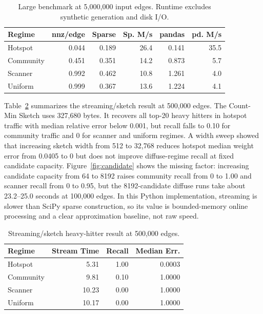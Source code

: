 \documentclass[conference]{IEEEtran}
\begin{document}
\begin{table}[t]
\centering
\caption{Large benchmark at 5,000,000 input edges. Runtime excludes synthetic generation and disk I/O.}
\label{tab:large}
\begin{tabular}{lrrrrr}
\toprule
Regime & nnz/edge & Sparse & Sp. M/s & pandas & pd. M/s \\
\midrule
Hotspot & 0.044 & 0.189 & 26.4 & 0.141 & 35.5 \\
Community & 0.451 & 0.351 & 14.2 & 0.873 & 5.7 \\
Scanner & 0.992 & 0.462 & 10.8 & 1.261 & 4.0 \\
Uniform & 0.999 & 0.367 & 13.6 & 1.224 & 4.1 \\
\bottomrule
\end{tabular}
\end{table}

Table~\ref{tab:streaming} summarizes the streaming/sketch result at 500,000 edges. The Count-Min Sketch uses 327,680 bytes. It recovers all top-20 heavy hitters in hotspot traffic with median relative error below 0.001, but recall falls to 0.10 for community traffic and 0 for scanner and uniform regimes. A width sweep showed that increasing sketch width from 512 to 32,768 reduces hotspot median weight error from 0.0405 to 0 but does not improve diffuse-regime recall at fixed candidate capacity. Figure~\ref{fig:candidate} shows the missing factor: increasing candidate capacity from 64 to 8192 raises community recall from 0 to 1.00 and scanner recall from 0 to 0.95, but the 8192-candidate diffuse runs take about 23.2--25.0 seconds at 100,000 edges. In this Python implementation, streaming is slower than SciPy sparse construction, so its value is bounded-memory online processing and a clear approximation baseline, not raw speed.

\begin{table}[t]
\centering
\caption{Streaming/sketch heavy-hitter result at 500,000 edges.}
\label{tab:streaming}
\begin{tabular}{lrrr}
\toprule
Regime & Stream Time & Recall & Median Err. \\
\midrule
Hotspot & 5.31 & 1.00 & 0.0003 \\
Community & 9.81 & 0.10 & 1.0000 \\
Scanner & 10.23 & 0.00 & 1.0000 \\
Uniform & 10.17 & 0.00 & 1.0000 \\
\bottomrule
\end{tabular}
\end{table}
\end{document}
